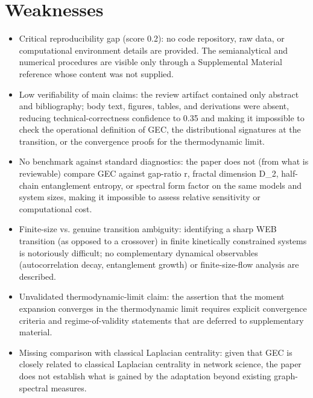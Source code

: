 \documentclass[11pt]{article}
\begin{document}
\section*{Weaknesses}
\begin{itemize}[leftmargin=*]
  \item Critical reproducibility gap (score 0.2): no code repository, raw data, or computational environment details are provided. The semianalytical and numerical procedures are visible only through a Supplemental Material reference whose content was not supplied.
  \item Low verifiability of main claims: the review artifact contained only abstract and bibliography; body text, figures, tables, and derivations were absent, reducing technical-correctness confidence to 0.35 and making it impossible to check the operational definition of GEC, the distributional signatures at the transition, or the convergence proofs for the thermodynamic limit.
  \item No benchmark against standard diagnostics: the paper does not (from what is reviewable) compare GEC against gap-ratio r, fractal dimension D\_2, half-chain entanglement entropy, or spectral form factor on the same models and system sizes, making it impossible to assess relative sensitivity or computational cost.
  \item Finite-size vs. genuine transition ambiguity: identifying a sharp WEB transition (as opposed to a crossover) in finite kinetically constrained systems is notoriously difficult; no complementary dynamical observables (autocorrelation decay, entanglement growth) or finite-size-flow analysis are described.
  \item Unvalidated thermodynamic-limit claim: the assertion that the moment expansion converges in the thermodynamic limit requires explicit convergence criteria and regime-of-validity statements that are deferred to supplementary material.
  \item Missing comparison with classical Laplacian centrality: given that GEC is closely related to classical Laplacian centrality in network science, the paper does not establish what is gained by the adaptation beyond existing graph-spectral measures.
\end{itemize}
\end{document}
